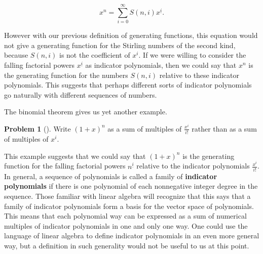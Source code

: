 \documentclass[10pt,]{book}
\newcommand{\terminology}[1]{\textbf{#1}}
\theoremstyle{plain}
\theoremstyle{definition}
\newtheorem{activity}[project]{Problem}
\theoremstyle{definition}
\numberwithin{equation}{chapter}
\begin{document}
\begin{equation*}
x^n = \sum_{i=0}^\infty S(n,i)x^{\underline{i}}.
\end{equation*}
%
\par
However with our previous definition of generating functions, this equation would not give a generating function for the Stirling numbers of the second kind, because \(S(n,i)\) is not the coefficient of \(x^i\). If we were willing to consider the falling factorial powers \(x^{\underline{i}}\) as indicator polynomials, then we could say that \(x^n\) is the generating function for the numbers \(S(n,i)\) relative to these indicator polynomials. This suggests that perhaps different sorts of indicator polynomials go naturally with different sequences of numbers.%
\par
The binomial theorem gives us yet another example.%
\begin{activity}[] \label{activity-371}
Write \((1+x)^n\) as a sum of multiples of \(\frac{x^i}{i!}\) rather than as a sum of multiples of \(x^i\).%
\end{activity}
This example suggests that we could say that \((1+x)^n\) is the generating function for the falling factorial powers \(n^{\underline{i}}\) relative to the indicator polynomials \(\frac{x^i}{i!}\). In general, a sequence of polynomials is called a family of \terminology{indicator polynomials} if there is one polynomial of each nonnegative integer degree in the sequence. Those familiar with linear algebra will recognize that this says that a family of indicator polynomials form a basis for the vector space of polynomials. This means that each polynomial way can be expressed as a sum of numerical multiples of indicator polynomials in one and only one way. One could use the language of linear algebra to define indicator polynomials in an even more general way, but a definition in such generality would not be useful to us at this point.%
\typeout{************************************************}
\typeout{************************************************}
\end{document}
